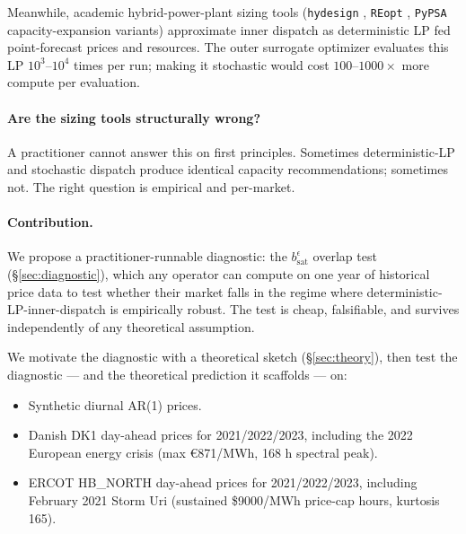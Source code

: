 \documentclass[11pt]{article}
\begin{document}
Meanwhile, academic hybrid-power-plant sizing tools (\texttt{hydesign} \citep{murcia2024hydesign}, \texttt{REopt} \citep{nrel2025bessdeg}, \texttt{PyPSA} capacity-expansion variants) approximate inner dispatch as deterministic LP fed point-forecast prices and resources. The outer surrogate optimizer evaluates this LP $10^3$--$10^4$ times per run; making it stochastic would cost $100$--$1000\times$ more compute per evaluation.

\paragraph{Are the sizing tools structurally wrong?} A practitioner cannot answer this on first principles. Sometimes deterministic-LP and stochastic dispatch produce identical capacity recommendations; sometimes not. The right question is empirical and per-market.

\paragraph{Contribution.} We propose a practitioner-runnable diagnostic: the $b_{\mathrm{sat}}^\epsilon$ overlap test (\S\ref{sec:diagnostic}), which any operator can compute on one year of historical price data to test whether their market falls in the regime where deterministic-LP-inner-dispatch is empirically robust. The test is cheap, falsifiable, and survives independently of any theoretical assumption.

We motivate the diagnostic with a theoretical sketch (\S\ref{sec:theory}), then test the diagnostic --- and the theoretical prediction it scaffolds --- on:

\begin{itemize}
\item Synthetic diurnal AR(1) prices.
\item Danish DK1 day-ahead prices for 2021/2022/2023, including the 2022 European energy crisis (max \euro 871/MWh, 168 h spectral peak).
\item ERCOT HB\_NORTH day-ahead prices for 2021/2022/2023, including February 2021 Storm Uri (sustained \$9000/MWh price-cap hours, kurtosis 165).
\end{itemize}
\end{document}
